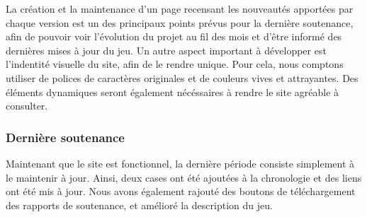             La création et la maintenance d'un page recensant les nouveautés apportées par chaque version est un des 
            principaux points prévus pour la dernière soutenance, afin de pouvoir voir l'évolution du projet au fil des 
            mois et d'être informé des dernières mises à jour du jeu. Un autre aspect important à développer est l'indentité
            visuelle du site, afin de le rendre unique. Pour cela,  nous comptons utiliser de polices de caractères originales 
            et de couleurs vives et attrayantes. Des éléments dynamiques seront également nécéssaires à rendre le site agréable 
            à consulter.

    \subsubsection{Dernière soutenance}

        Maintenant que le site est fonctionnel, la dernière période consiste simplement à le maintenir à jour. Ainsi, deux cases 
        ont été ajoutées à la chronologie et des liens ont été mis à jour. Nous avons également rajouté des boutons de téléchargement 
        des rapports de soutenance, et amélioré la description du jeu.